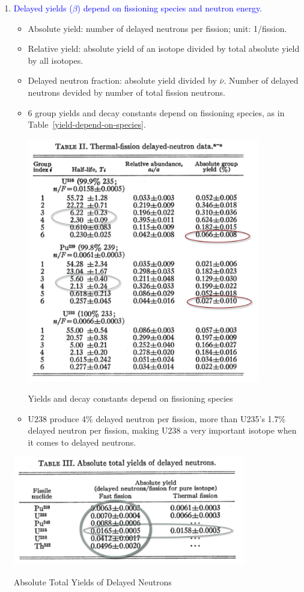 \documentclass{school-22.211-notes}
\begin{document}
\begin{enumerate}
\item  \textcolor{blue}{Delayed yields ($\beta$) depend on fissioning species and neutron energy.}
  \begin{itemize}
  \item Absolute yield: number of delayed neutrons per fission; unit: 1/fission. 
  \item Relative yield: absolute yield of an isotope divided by total absolute yield by all isotopes. 
  \item Delayed neutron fraction: absolute yield divided by $\bar{\nu}$. Number of delayed neutrons devided by number of total fission neutrons. 
  \item 6 group yields and decay constants depend on fissioning species, as in Table~\ref{yield-depend-on-species}.
    \begin{table}[ht]
      \centering
      \includegraphics[width=4in]{images/pke/yield-depend-on-species.png}
      \caption{Yields and decay constants depend on fissioning species} \label{yield-depend-on-species}
    \end{table}
  \item U238 produce 4\% delayed neutron per fission, more than U235's 1.7\% delayed neutron per fission, making U238 a very important isotope when it comes to delayed neutrons.
  \end{itemize}
  \begin{table}[ht]
    \centering
    \includegraphics[width=4in]{images/pke/abs-yield.png}
    \caption{Absolute Total Yields of Delayed Neutrons} \label{abs-yield} 
  \end{table}


\end{enumerate}
\end{document}
